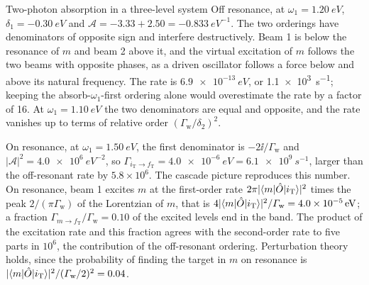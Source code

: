 \begin{workedexample}{Two-photon absorption in a three-level system}
Off resonance, at $\omega_1 = \SI{1.20}{eV}$, $\delta_1 = \SI{-0.30}{eV}$ and $\mathcal{A} = -3.33 + 2.50 = \SI{-0.833}{eV^{-1}}$. The two orderings have denominators of opposite sign and interfere destructively. Beam 1 is below the resonance of $m$ and beam 2 above it, and the virtual excitation of $m$ follows the two beams with opposite phases, as a driven oscillator follows a force below and above its natural frequency. The rate is $\SI{6.9e-13}{eV}$, or \SI{1.1e3}{s^{-1}}; keeping the absorb-$\omega_1$-first ordering alone would overestimate the rate by a factor of 16. At $\omega_1 = \SI{1.10}{eV}$ the two denominators are equal and opposite, and the rate vanishes up to terms of relative order $(\varGamma_{\mathrm{w}}/\delta_2)^2$.

On resonance, at $\omega_1 = \SI{1.50}{eV}$, the first denominator is $-2\ii/\varGamma_{\mathrm{w}}$ and $|\mathcal{A}|^2 = \SI{4.0e6}{eV^{-2}}$, so $\varGamma_{i_{\mathrm{T}}\to f_{\mathrm{T}}} = \SI{4.0e-6}{eV} = \SI{6.1e9}{s^{-1}}$, larger than the off-resonant rate by $5.8\times10^6$. The cascade picture reproduces this number. On resonance, beam 1 excites $m$ at the first-order rate $2\pi|\langle m|\hat{O}|i_{\mathrm{T}}\rangle|^2$ times the peak $2/(\pi\varGamma_{\mathrm{w}})$ of the Lorentzian of $m$, that is $4|\langle m|\hat{O}|i_{\mathrm{T}}\rangle|^2/\varGamma_{\mathrm{w}} = \SI{4.0e-5}{eV}$; a fraction $\varGamma_{m\to f_{\mathrm{T}}}/\varGamma_{\mathrm{w}} = 0.10$ of the excited levels end in the band. The product of the excitation rate and this fraction agrees with the second-order rate to five parts in $10^6$, the contribution of the off-resonant ordering. Perturbation theory holds, since the probability of finding the target in $m$ on resonance is $|\langle m|\hat{O}|i_{\mathrm{T}}\rangle|^2/(\varGamma_{\mathrm{w}}/2)^2 = 0.04$.


\end{workedexample}
